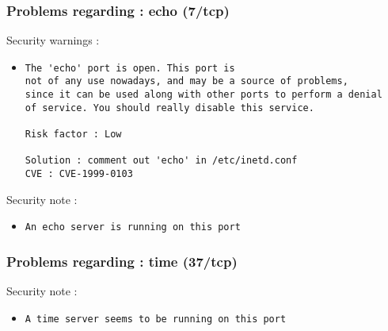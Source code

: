 \documentclass{article}
\begin{document}
\subsubsection{Problems regarding : echo (7/tcp)}
Security warnings :\\
\begin{itemize}
\item \begin{verbatim}
The 'echo' port is open. This port is
not of any use nowadays, and may be a source of problems, 
since it can be used along with other ports to perform a denial
of service. You should really disable this service.

Risk factor : Low

Solution : comment out 'echo' in /etc/inetd.conf
CVE : CVE-1999-0103
\end{verbatim}\end{itemize}
Security note :\\
\begin{itemize}
\item \begin{verbatim}
An echo server is running on this port
\end{verbatim}\end{itemize}
\subsubsection{Problems regarding : time (37/tcp)}
Security note :\\
\begin{itemize}
\item \begin{verbatim}
A time server seems to be running on this port
\end{verbatim}\end{itemize}
\end{document}
